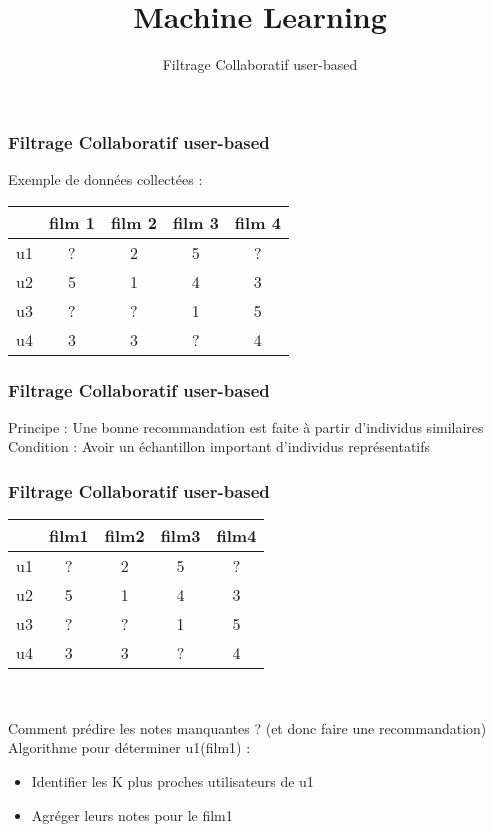 \documentclass{formation}
\title{Machine Learning}
\subtitle{Filtrage Collaboratif user-based}
\begin{document}
\maketitle

\begin{frame}
  \frametitle{Filtrage Collaboratif user-based}
  Exemple de données collectées :
  \begin{center}
  \begin{tabular}{|l|c|c|c|c|}
    \hline
     & film 1 & film 2 & film 3 & film 4 \\
    \hline
    u1 & ? & 2 & 5 & ? \\
    \hline
    u2 & 5 & 1 & 4 & 3 \\
    \hline
    u3 & ? & ? & 1 & 5 \\
    \hline
    u4 & 3 & 3 & ? & 4 \\
    \hline
  \end{tabular}
  \end{center}
\end{frame}

\begin{frame}
  \frametitle{Filtrage Collaboratif user-based}
  Principe : Une bonne recommandation est faite à partir d'individus similaires\\
  \newline
  Condition : Avoir un échantillon important d'individus représentatifs
\end{frame}

\begin{frame}
  \frametitle{Filtrage Collaboratif user-based}
  \begin{center}
    \begin{tabular}{|l|c|c|c|c|}
      \hline
      & film1 & film2 & film3 & film4 \\
      \hline
      u1 & ? & 2 & 5 & ? \\
      \hline
      u2 & 5 & 1 & 4 & 3 \\
    \hline
    u3 & ? & ? & 1 & 5 \\
    \hline
    u4 & 3 & 3 & ? & 4 \\
    \hline
    \end{tabular}\\
    \end{center}
  Comment prédire les notes manquantes ? (et donc faire une recommandation) \\
  \newline
  Algorithme pour déterminer u1(film1) :
  \begin{itemize}
  \item Identifier les K plus proches utilisateurs de u1
  \item Agréger leurs notes pour le film1
  \end{itemize}
\end{frame}
\end{document}
